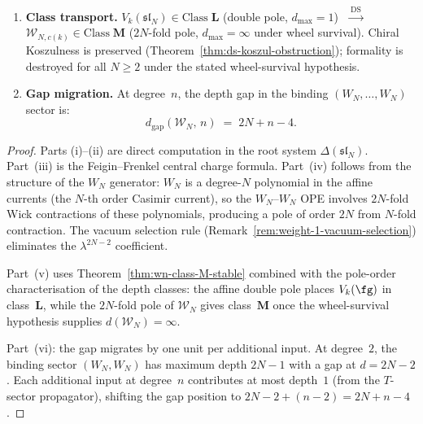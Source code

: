 \begin{theorem}
\begin{enumerate}[label=\textup{(\roman*)}]
 \begin{equation}
 \label{eq:wn-collision-gap}
 d_{\mathrm{gap}}(\mathcal{W}_N,\, 2) \;=\; 2N - 2.
 \end{equation}
\item \textbf{Class transport.}
 $V_k(\mathfrak{sl}_N) \in \mathrm{Class}\;\mathbf{L}$
 \textup{(}double pole, $d_{\max} = 1$\textup{)}
 $\;\xrightarrow{\;\mathrm{DS}\;}\;$
 $\mathcal{W}_{N,c(k)} \in \mathrm{Class}\;\mathbf{M}$
 \textup{(}$2N$-fold pole, $d_{\max} = \infty$ under wheel survival\textup{)}.
 Chiral Koszulness is preserved
 \textup{(}Theorem~\textup{\ref{thm:ds-koszul-obstruction})};
 formality is destroyed for all $N \ge 2$ under the stated
 wheel-survival hypothesis.
\item \textbf{Gap migration.}
 At degree~$n$, the depth gap in the binding
 $(W_N, \ldots, W_N)$ sector is:
 \begin{equation}
 \label{eq:wn-gap-migration}
 d_{\mathrm{gap}}(\mathcal{W}_N,\, n) \;=\; 2N + n - 4.
 \end{equation}
\end{enumerate}
\end{theorem}

\begin{proof}
Parts (i)--(ii) are direct computation in the root system
$\Delta(\mathfrak{sl}_N)$. Part~(iii) is the Feigin--Frenkel
central charge formula. Part~(iv) follows from the structure
of the $W_N$ generator: $W_N$ is a degree-$N$ polynomial in
the affine currents (the $N$-th order Casimir current), so the
$W_N$--$W_N$ OPE involves $2N$-fold Wick contractions of these
polynomials, producing a pole of order $2N$ from $N$-fold
contraction. The vacuum selection rule
(Remark~\ref{rem:weight-1-vacuum-selection}) eliminates the
$\lambda^{2N-2}$ coefficient.

Part~(v) uses Theorem~\ref{thm:wn-class-M-stable}
combined with the pole-order characterisation of the depth classes:
the affine double pole places $V_k(\fg)$ in class~$\mathbf{L}$, while
the $2N$-fold pole of $\mathcal{W}_N$ gives class~$\mathbf{M}$ once the
wheel-survival hypothesis supplies $d(\mathcal{W}_N)=\infty$.

Part~(vi): the gap migrates by one unit per additional input.
At degree~$2$, the binding sector $(W_N, W_N)$ has maximum depth
$2N - 1$ with a gap at $d = 2N - 2$. Each additional input
at degree~$n$ contributes at most depth~$1$ (from the $T$-sector
propagator), shifting the gap position to $2N - 2 + (n - 2)
= 2N + n - 4$.
\end{proof}

